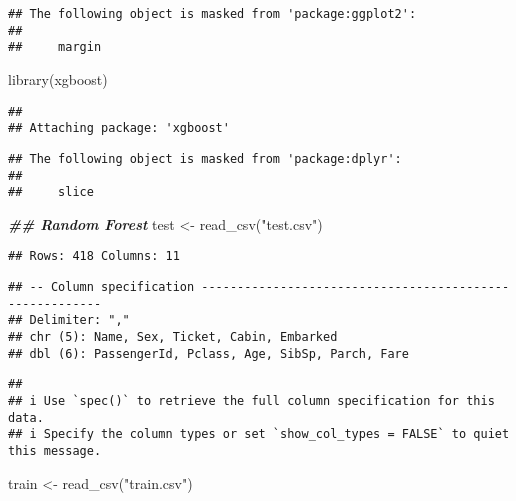 \documentclass[
]{article}
\newenvironment{Shaded}{\begin{snugshade}}{\end{snugshade}}
\newcommand{\DocumentationTok}[1]{\textcolor[rgb]{0.56,0.35,0.01}{\textbf{\textit{#1}}}}
\newcommand{\FunctionTok}[1]{\textcolor[rgb]{0.00,0.00,0.00}{#1}}
\newcommand{\NormalTok}[1]{#1}
\newcommand{\OtherTok}[1]{\textcolor[rgb]{0.56,0.35,0.01}{#1}}
\newcommand{\StringTok}[1]{\textcolor[rgb]{0.31,0.60,0.02}{#1}}
\begin{document}
\begin{verbatim}
## The following object is masked from 'package:ggplot2':
## 
##     margin
\end{verbatim}

\begin{Shaded}
\begin{Highlighting}[]
\FunctionTok{library}\NormalTok{(xgboost)}
\end{Highlighting}
\end{Shaded}

\begin{verbatim}
## 
## Attaching package: 'xgboost'
\end{verbatim}

\begin{verbatim}
## The following object is masked from 'package:dplyr':
## 
##     slice
\end{verbatim}

\begin{Shaded}
\begin{Highlighting}[]
\DocumentationTok{\#\# Random Forest}
\NormalTok{test }\OtherTok{\textless{}{-}} \FunctionTok{read\_csv}\NormalTok{(}\StringTok{"test.csv"}\NormalTok{)}
\end{Highlighting}
\end{Shaded}

\begin{verbatim}
## Rows: 418 Columns: 11
\end{verbatim}

\begin{verbatim}
## -- Column specification --------------------------------------------------------
## Delimiter: ","
## chr (5): Name, Sex, Ticket, Cabin, Embarked
## dbl (6): PassengerId, Pclass, Age, SibSp, Parch, Fare
\end{verbatim}

\begin{verbatim}
## 
## i Use `spec()` to retrieve the full column specification for this data.
## i Specify the column types or set `show_col_types = FALSE` to quiet this message.
\end{verbatim}

\begin{Shaded}
\begin{Highlighting}[]
\NormalTok{train }\OtherTok{\textless{}{-}} \FunctionTok{read\_csv}\NormalTok{(}\StringTok{"train.csv"}\NormalTok{)}
\end{Highlighting}
\end{Shaded}
\end{document}
